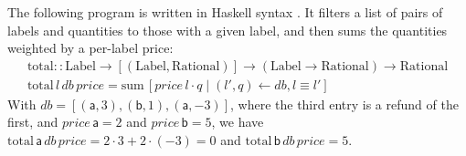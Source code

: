 \begin{example}
  \label{ex:introduction-example}
  The following program is written in Haskell syntax \cite{haskell}. It filters a list of pairs of labels and
  quantities to those with a given label, and then sums the quantities weighted by a per-label price:
  \begin{displaymath}
    \begin{array}{l}
      \mathrm{total} :: \mathrm{Label} \to [(\mathrm{Label}, \mathrm{Rational})] \to (\mathrm{Label} \to \mathrm{Rational}) \to \mathrm{Rational} \\
      \mathrm{total}\,l\,\mathit{db}\,\mathit{price} = \mathrm{sum}\,[ \mathit{price}\,l \cdot q \mid (l',q) \leftarrow \mathit{db}, l \equiv l' ]
    \end{array}
  \end{displaymath}
  With $\mathit{db} = [(\mathsf{a}, 3), (\mathsf{b}, 1), (\mathsf{a}, -3)]$, where the third entry is a refund
  of the first, and $\mathit{price}\,\mathsf{a} = 2$ and $\mathit{price}\,\mathsf{b} = 5$, we have
  $\mathrm{total}\,\mathsf{a}\,\mathit{db}\,\mathit{price} = 2 \cdot 3 + 2 \cdot (-3) = 0$ and
  $\mathrm{total}\,\mathsf{b}\,\mathit{db}\,\mathit{price} = 5$.


\end{example}

